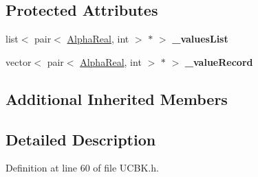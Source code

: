 \subsection*{Protected Attributes}
\begin{DoxyCompactItemize}
\item 
\hypertarget{classMultiBoost_1_1UCBK_acd9af22d1331ef55cf83c6420727cbbd}{list$<$ pair$<$ \hyperlink{Defaults_8h_a80184c4fd10ab70a1a17c5f97dcd1563}{Alpha\-Real}, int $>$ $\ast$ $>$ {\bfseries \-\_\-values\-List}}\label{classMultiBoost_1_1UCBK_acd9af22d1331ef55cf83c6420727cbbd}

\item 
\hypertarget{classMultiBoost_1_1UCBK_afde88a770c0349b6c58bf2ce1da95402}{vector$<$ pair$<$ \hyperlink{Defaults_8h_a80184c4fd10ab70a1a17c5f97dcd1563}{Alpha\-Real}, int $>$ $\ast$ $>$ {\bfseries \-\_\-value\-Record}}\label{classMultiBoost_1_1UCBK_afde88a770c0349b6c58bf2ce1da95402}

\end{DoxyCompactItemize}
\subsection*{Additional Inherited Members}


\subsection{Detailed Description}


Definition at line 60 of file U\-C\-B\-K.\-h.



